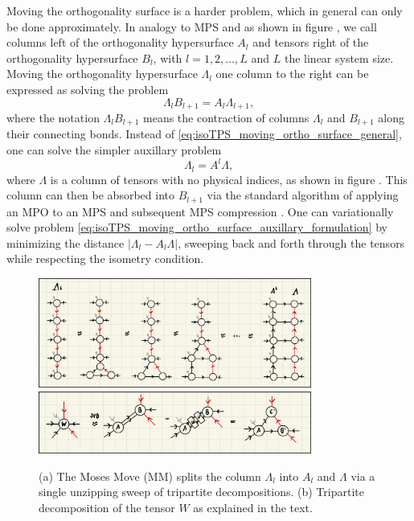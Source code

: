 Moving the orthogonality surface is a harder problem, which in general can only be done approximately. In analogy to MPS and as shown in figure , we call columns left of the orthogonality hypersurface $A_l$ and tensors right of the orthogonality hypersurface $B_l$, with $l = 1,2,\dots,L$ and $L$ the linear system size. Moving the orthogonality hypersurface $\Lambda_l$ one column to the right can be expressed as solving the problem
\begin{equation}
	\label{eq:isoTPS_moving_ortho_surface_general}
	\Lambda_l B_{l+1} = A_l \Lambda_{l+1},
\end{equation}
where the notation $\Lambda_l B_{l+1}$ means the contraction of columns $\Lambda_l$ and $B_{l+1}$ along their connecting bonds. Instead of \eqref{eq:isoTPS_moving_ortho_surface_general}, one can solve the simpler auxillary problem
\begin{equation}
	\label{eq:isoTPS_moving_ortho_surface_auxillary_formulation}
	\Lambda_l = A^l \Lambda,
\end{equation}
where $\Lambda$ is a column of tensors with no physical indices, as shown in figure . This column can then be absorbed into $B_{l+1}$ via the standard algorithm of applying an MPO to an MPS and subsequent MPS compression \cite{cite:DMRG_in_the_age_of_MPS}. One can variationally solve problem \eqref{eq:isoTPS_moving_ortho_surface_auxillary_formulation} by minimizing the distance $\left\lvert\Lambda_l-A_l\Lambda\right\rvert$, sweeping back and forth through the tensors while respecting the isometry condition.
\begin{figure}
	\centering
	\subcaptionbox{\label{fig:Moses_move}}
	{%
		\includegraphics[width=0.8\textwidth]{figures/Tensor_Networks/MM.jpeg}
	}
	\subcaptionbox{\label{fig:tripartite_decomposition}}
	{%
		\includegraphics[width=0.8\textwidth]{figures/Tensor_Networks/Tripartite_decomposition.jpeg}
	}
	\caption{(a) The Moses Move (MM) splits the column $\Lambda_l$ into $A_l$ and $\Lambda$ via a single unzipping sweep of tripartite decompositions. (b) Tripartite decomposition of the tensor $W$ as explained in the text.}
	\label{fig:Moses_move_and_tripartite_decomposition}
\end{figure}
